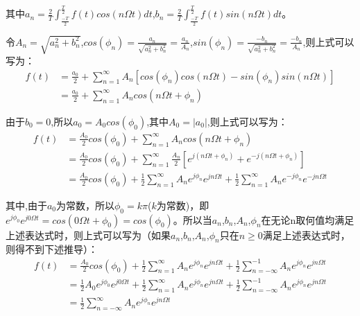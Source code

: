 \documentclass{article}
\numberwithin{equation}{section}
\numberwithin{figure}{section}
\begin{document}
其中$a_n=\frac{2}{T}\int_{\frac{-T}{2}}^{\frac{T}{2}}f(t)cos(n\Omega t)dt$,$b_n=\frac{2}{T}\int_{\frac{-T}{2}}^{\frac{T}{2}}f(t)sin(n\Omega t)dt$。

令$A_n=\sqrt{a_n^2+b_n^2}$,$cos(\phi_n)=\frac{a_n}{\sqrt{a_n^2+b_n^2}}=\frac{a_n}{A_n}$,$sin(\phi_n)=\frac{-b_n}{\sqrt{a_n^2+b_n^2}}=\frac{-b_n}{A_n}$,则上式可以写为：
\begin{equation}
    \begin{split}
        f(t)&=\frac{a_0}{2}+\sum_{n = 1}^{\infty}A_n[cos(\phi_n)cos(n\Omega t)-sin(\phi_n)sin(n\Omega t)]\\
        &=\frac{a_0}{2}+\sum_{n = 1}^{\infty}A_ncos(n\Omega t+\phi_n)
    \end{split}
\end{equation}

由于$b_0=0$,所以$a_0=A_0cos(\phi_0)$,其中$A_0=|a_0|$,则上式可以写为：
\begin{equation}
    \begin{split}
        f(t)&=\frac{A_0}{2}cos(\phi_0)+\sum_{n = 1}^{\infty}A_ncos(n\Omega t+\phi_n)\\
        &=\frac{A_0}{2}cos(\phi_0)+\sum_{n = 1}^{\infty}\frac{A_n}{2}[e^{j(n\Omega t+\phi_n)}+e^{-j(n\Omega t+\phi_n)}]\\
        &=\frac{A_0}{2}cos(\phi_0)+\frac{1}{2}\sum_{n = 1}^{\infty}A_ne^{j\phi_n}e^{jn\Omega t}+\frac{1}{2}\sum_{n = 1}^{\infty}A_ne^{-j\phi_n}e^{-jn\Omega t}
    \end{split}
\end{equation}

其中,由于$a_0$为常数，所以$\phi_0=k\pi$($k$为常数)，即$e^{j\phi_0}e^{j0\Omega t}=cos(0\Omega t+\phi_0)=cos(\phi_0)$。所以当$a_n$,$b_n$,$A_n$,$\phi_n$在无论n取何值均满足上述表达式时，则上式可以写为（如果$a_n$,$b_n$,$A_n$,$\phi_n$只在$n≥0$满足上述表达式时，则得不到下述推导）：
\begin{equation}
    \begin{split}
        f(t)&=\frac{A_0}{2}cos(\phi_0)+\frac{1}{2}\sum_{n = 1}^{\infty}A_ne^{j\phi_n}e^{jn\Omega t}+\frac{1}{2}\sum_{n = -\infty}^{-1}A_ne^{j\phi_n}e^{jn\Omega t}\\
        &=\frac{1}{2}A_0e^{j\phi_0}e^{j0\Omega t}+\frac{1}{2}\sum_{n = 1}^{\infty}A_ne^{j\phi_n}e^{jn\Omega t}+\frac{1}{2}\sum_{n = -\infty}^{-1}A_ne^{j\phi_n}e^{jn\Omega t}\\
        &=\frac{1}{2}\sum_{n = -\infty}^{\infty}A_ne^{j\phi_n}e^{jn\Omega t}
    \end{split}
\end{equation}
\end{document}
